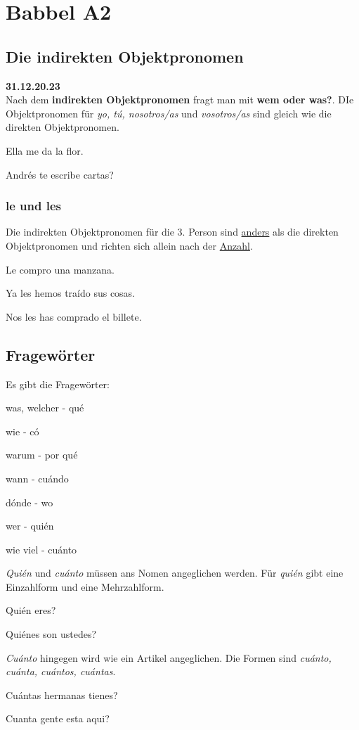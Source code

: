 \chapter{Babbel A2}
\section{Die indirekten Objektpronomen}
\textbf{31.12.20.23}\\
Nach dem \textbf{indirekten Objektpronomen} fragt man mit 
\textbf{wem oder was?}. DIe Objektpronomen für 
\textit{yo, t\'u, nosotros/as} und \textit{vosotros/as} sind 
gleich wie die direkten Objektpronomen.
\begin{ejemplos}
    \item Ella me da la flor.
    \item Andr\'es te escribe cartas?
\end{ejemplos}
\subsection*{le und les}
Die indirekten Objektpronomen für die 3. Person sind 
\underline{anders} als die direkten Objektpronomen und
richten sich allein nach der \underline{Anzahl}.
\begin{ejemplos}
    \item Le compro una manzana.
    \item Ya les hemos tra\'ido sus cosas.
    \item Nos les has comprado el billete.
\end{ejemplos}
\section{Fragewörter}
Es gibt die Fragewörter:
\begin{gramatica}
    \item was, welcher - qu\'e
    \item wie - c\'o
    \item warum - por qu\'e
    \item wann - cu\'ando
    \item d\'onde - wo
    \item wer - qui\'en
    \item wie viel - cu\'anto
\end{gramatica}
\textit{Qui\'en} und \textit{cu\'anto} müssen ans Nomen 
angeglichen werden. Für \textit{qui\'en} gibt eine
Einzahlform und eine Mehrzahlform.
\begin{ejemplos}
    \item Qui\'en eres?
    \item Qui\'enes son ustedes?
\end{ejemplos}
\textit{Cu\'anto} hingegen wird wie ein Artikel angeglichen.
Die Formen sind \textit{cu\'anto, cu\'anta, cu\'antos, cu\'antas}. 
\begin{ejemplos}
    \item Cu\'antas hermanas tienes?
    \item Cuanta gente esta aqui?
\end{ejemplos}
